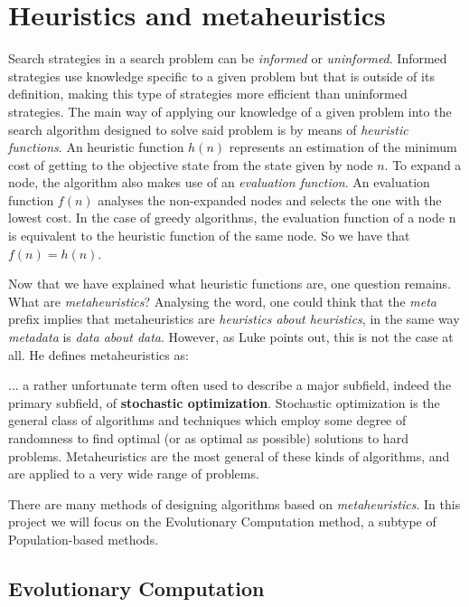 \section{Heuristics and metaheuristics}

Search strategies in a search problem can be \textit{informed} or \textit{uninformed}. Informed strategies use knowledge specific to a given problem but that is outside of its definition, making this type of strategies more efficient than uninformed strategies. The main way of applying our knowledge of a given problem into the search algorithm designed to solve said problem is by means of \textit{heuristic functions}. An heuristic function $h(n)$ \cite{russellnorvig10ai} represents an estimation of the minimum cost of getting to the objective state from the state given by node $n$. To expand a node, the algorithm also makes use of an \textit{evaluation function}. An evaluation function $f(n)$ analyses the non-expanded nodes and selects the one with the lowest cost. In the case of greedy algorithms, the evaluation function of a node n is equivalent to the heuristic function of the same node. So we have that $f(n) = h(n)$.

Now that we have explained what heuristic functions are, one question remains. What are \textit{metaheuristics}? Analysing the word, one could think that the \textit{meta} prefix implies that metaheuristics are \textit{heuristics about heuristics}, in the same way \textit{metadata} is \textit{data about data}. However, as Luke \cite{luke13metaheuristics} points out, this is not the case at all. He defines metaheuristics as:

\begin{displayquote}
    ... a rather unfortunate term often used to describe a major subfield, indeed the primary subfield, of \textbf{stochastic optimization}. Stochastic optimization is the general class of algorithms and techniques which employ some degree of randomness to find optimal (or as optimal as possible) solutions to hard problems. Metaheuristics are the most general of these kinds of algorithms, and are applied to a very wide range of problems.
\end{displayquote}

There are many methods of designing algorithms based on \textit{metaheuristics}. In this project we will focus on the Evolutionary Computation method, a subtype of Population-based methods.


\subsection{Evolutionary Computation}

